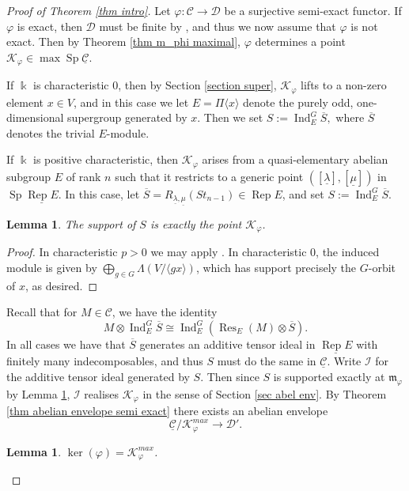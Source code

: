 \documentclass[11pt]{amsart}
\def\ker{\operatorname{ker}}
\def\Ind{\operatorname{Ind}}
\def\KK{\mathcal{K}}
\def\Cs{\mathcal{C}}
\def\II{\mathcal{I}}
\def\Cs{\mathscr{C}}
\def\Ds{\mathscr{D}}
\def\m{\mathfrak{m}}
\def\ol{\overline}
\def\Rep{\operatorname{Rep}}
\def\ul{\underline}
\def\Res{\operatorname{Res}}
\def\Sp{\operatorname{Sp}}
\newtheorem{lemma}[thm]{Lemma}
\theoremstyle{definition}
\theoremstyle{remark}
\numberwithin{equation}{section}
\begin{document}
\begin{proof}[Proof of Theorem \ref{thm intro}]
    Let $\varphi:\Cs\to\Ds$ be a surjective semi-exact functor.  If $\varphi$ is exact, then $\Ds$ must be finite by \cite[Prop.~1.8.19]{EGNO}, and thus we now assume that $\varphi$ is not exact.  Then by Theorem \ref{thm m_phi maximal}, $\varphi$ determines a point $\KK_{\varphi}\in\max\Sp\ul{\Cs}$.  
    
    If $\Bbbk$ is characteristic 0, then by Section \ref{section super}, $\KK_{\varphi}$ lifts to a non-zero element $x\in V$, and in this case we let $E=\Pi\langle x\rangle$ denote the purely odd, one-dimensional supergroup generated by $x$. Then we set $S:=\Ind_{E}^{G}\ol{S},$ where $\ol{S}$ denotes the trivial $E$-module.
    
    If $\Bbbk$ is positive characteristic, then $\KK_{\varphi}$ arises from a quasi-elementary abelian subgroup $E$ of rank $n$ such that it restricts to a generic point $([\ul{\lambda}],[\ul{\mu}])$ in $\Sp\ul{\Rep E}$.  In this case, let $\ol{S}=R_{\ul{\lambda},\ul{\mu}}(St_{n-1})\in\Rep E$, and set $S:=\Ind_{E}^{G}\ol{S}$.
    \begin{lemma}\label{lemma supp of S}
        The support of $S$ is exactly the point $\KK_{\varphi}$.
    \end{lemma}

    \begin{proof}
        In characteristic $p>0$ we may apply \cite[Prop.~9.5(2)]{BIKP}.  In characteristic 0, the induced module is given by $\bigoplus\limits_{g\in G}\Lambda(V/\langle gx\rangle)$, which has support precisely the $G$-orbit of $x$, as desired.
    \end{proof}

    Recall that for $M\in\Cs$, we have the identity 
    \[
    M\otimes\Ind_{E}^{G}\ol{S}\cong \Ind_{E}^{G}(\Res_E(M)\otimes \ol{S}).
    \]
    In all cases we have that $\ol{S}$ generates an additive tensor ideal in $\ul{\Rep E}$ with finitely many indecomposables, and thus $S$ must do the same in $\ul{\Cs}$.  Write $\II$ for the additive tensor ideal generated by $S$.  Then since $S$ is supported exactly at $\m_{\varphi}$ by Lemma \ref{lemma supp of S}, $\II$ realises $\KK_{\varphi}$ in the sense of Section \ref{sec abel env}. By Theorem \ref{thm abelian envelope semi exact} there exists an abelian envelope
    \[
    \ul{\Cs}/\KK_\varphi^{max}\to \Ds'.
    \]
   

    \begin{lemma}\label{lemma varphi kills k_x}
        $\ker(\varphi)=\KK_\varphi^{max}$.
    \end{lemma}


\end{proof}
\end{document}
